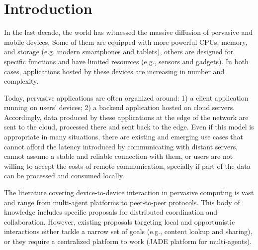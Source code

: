 \section{Introduction}
\label{sec:intro}






In the last decade, the world has witnessed the massive diffusion of pervasive and mobile devices. Some of them are equipped with more powerful CPUs, memory, and storage (e.g. modern smartphones and tablets), others are designed for specific functions and have limited resources (e.g., sensors and gadgets). In both cases, applications hosted by these devices are increasing in number and complexity. 
%

Today, pervasive applications are often organized around: 1) a client application running on users' devices; 2) a backend application hosted on cloud servers. Accordingly, data produced by these applications at the edge of the network are sent to the cloud, processed there and sent back to the edge. Even if this model is appropriate in many situations, there are existing and emerging use cases that cannot afford the latency introduced by communicating with distant servers, cannot assume a stable and reliable connection with them, or users are not willing to accept the costs of remote communication, specially if part of the data can be processed and consumed locally.

The literature covering device-to-device interaction in pervasive computing is vast and range from multi-agent platforms to peer-to-peer protocols. This body of knowledge includes specific proposals for distributed coordination and collaboration. However, existing proposals targeting local and opportunistic interactions either tackle a narrow set of goals (e.g., content lookup and sharing), or they require a centralized platform to work (JADE platform for multi-agents). 

